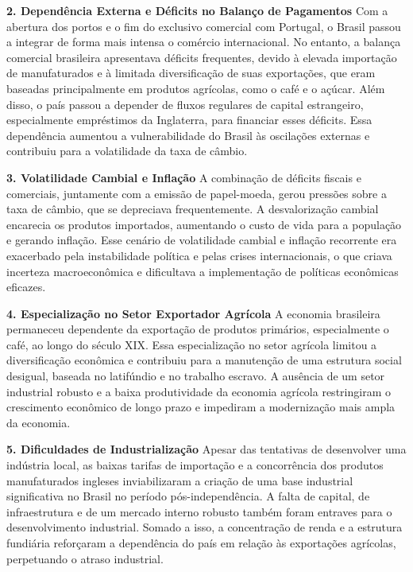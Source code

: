 \documentclass[a4paper,12pt]{article}[abntex2]
\begin{document}
\textbf{2. Dependência Externa e Déficits no Balanço de Pagamentos}
Com a abertura dos portos e o fim do exclusivo comercial com Portugal, o Brasil passou a integrar de forma mais intensa o comércio internacional. No entanto, a balança comercial brasileira apresentava déficits frequentes, devido à elevada importação de manufaturados e à limitada diversificação de suas exportações, que eram baseadas principalmente em produtos agrícolas, como o café e o açúcar. Além disso, o país passou a depender de fluxos regulares de capital estrangeiro, especialmente empréstimos da Inglaterra, para financiar esses déficits. Essa dependência aumentou a vulnerabilidade do Brasil às oscilações externas e contribuiu para a volatilidade da taxa de câmbio.

\textbf{3. Volatilidade Cambial e Inflação}
A combinação de déficits fiscais e comerciais, juntamente com a emissão de papel-moeda, gerou pressões sobre a taxa de câmbio, que se depreciava frequentemente. A desvalorização cambial encarecia os produtos importados, aumentando o custo de vida para a população e gerando inflação. Esse cenário de volatilidade cambial e inflação recorrente era exacerbado pela instabilidade política e pelas crises internacionais, o que criava incerteza macroeconômica e dificultava a implementação de políticas econômicas eficazes.

\textbf{4. Especialização no Setor Exportador Agrícola}
A economia brasileira permaneceu dependente da exportação de produtos primários, especialmente o café, ao longo do século XIX. Essa especialização no setor agrícola limitou a diversificação econômica e contribuiu para a manutenção de uma estrutura social desigual, baseada no latifúndio e no trabalho escravo. A ausência de um setor industrial robusto e a baixa produtividade da economia agrícola restringiram o crescimento econômico de longo prazo e impediram a modernização mais ampla da economia.

\textbf{5. Dificuldades de Industrialização}
Apesar das tentativas de desenvolver uma indústria local, as baixas tarifas de importação e a concorrência dos produtos manufaturados ingleses inviabilizaram a criação de uma base industrial significativa no Brasil no período pós-independência. A falta de capital, de infraestrutura e de um mercado interno robusto também foram entraves para o desenvolvimento industrial. Somado a isso, a concentração de renda e a estrutura fundiária reforçaram a dependência do país em relação às exportações agrícolas, perpetuando o atraso industrial.
\end{document}
